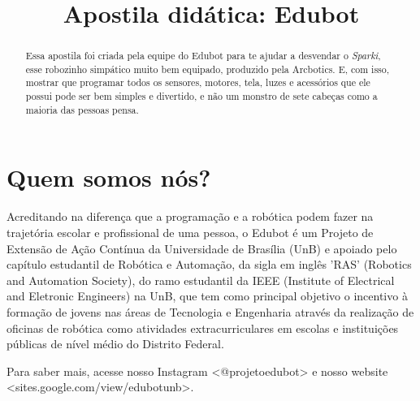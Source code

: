 \documentclass[conference]{IEEEtran}
\begin{document}
\title{Apostila didática: Edubot}
\author{
}
\maketitle

\begin{abstract}
    Essa apostila foi criada pela equipe do Edubot para te ajudar a desvendar o \textit{Sparki}, esse robozinho simpático muito bem equipado, produzido pela Arcbotics. E, com isso, mostrar que programar todos os sensores, motores, tela, luzes e acessórios que ele possui pode ser bem simples e divertido, e não um monstro de sete cabeças como a maioria das pessoas pensa.
\end{abstract}
\section{\textbf{Quem somos nós?}}
    Acreditando na diferença que a programação e a robótica podem fazer na trajetória escolar e profissional de uma pessoa, o Edubot é um Projeto de Extensão de Ação Contínua da Universidade de Brasília (UnB) e apoiado pelo capítulo estudantil de Robótica e Automação, da sigla em inglês 'RAS' (Robotics and Automation Society), do ramo estudantil da IEEE (Institute of Electrical and Eletronic Engineers) na UnB, que tem como principal objetivo o incentivo à formação de jovens nas áreas de Tecnologia e Engenharia através da realização de oficinas de robótica como atividades extracurriculares em escolas e instituições públicas de nível médio do Distrito Federal.
\\
    \par
    Para saber mais, acesse nosso Instagram <@projetoedubot> e nosso website <sites.google.com/view/edubotunb>.
\end{document}
